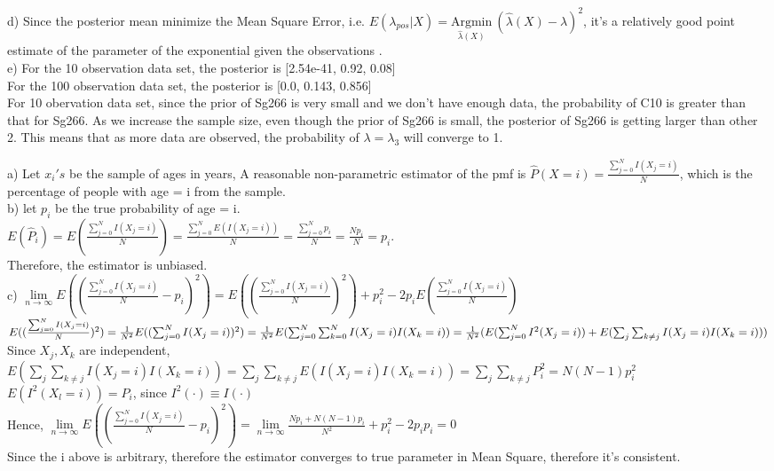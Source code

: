 \documentclass[11pt]{article}
\newenvironment{problem}[2][Problem]{\begin{trivlist}
\item[\hskip \labelsep {\bfseries #1}\hskip \labelsep {\bfseries #2.}]}{\end{trivlist}}
\begin{document}
 d) Since the posterior mean minimize the Mean Square Error, i.e. $E(\lambda_{pos}|X) =  \underset{\hat{\lambda}(X)} {\mathrm{Argmin}} ~ (\hat{\lambda}(X) - \lambda)^2 $, it's a relatively good point estimate of the parameter of the exponential given the observations .\\
 
 e) For the 10 observation data set, the posterior is [2.54e-41, 0.92, 0.08]\\
 For the 100 observation data set, the posterior is [0.0, 0.143, 0.856] \\
 For 10 obervation data set, since the prior of Sg266 is very small and we don't have enough data, the probability of C10 is greater than that for Sg266. 
 As we increase the sample size, even though the prior of Sg266 is small, the posterior of Sg266 is getting larger than other 2. This means that as more data are observed, the probability of $\lambda = \lambda_3$ will converge to 1.\\
 
\begin{problem}{3}
\end{problem} 
a) Let $x_i's$ be the sample of ages in years, A reasonable non-parametric estimator of the pmf is $\hat{P}(X = i) = \frac{\sum_{j =0}^N I(X_j =i )}{N} $, which is the percentage of people with age = i from the sample. \\

b) let $p_i$ be the true probability of age = i.\\
$E(\hat{P}_i) = E(\frac{\sum_{j =0}^N I(X_j =i )}{N}) = \frac{\sum_{j =0}^N E(I(X_j =i ))}{N} =  \frac{\sum_{j =0}^N p_i}{N} = \frac{Np_i}{N} = p_i $.\\ Therefore, the estimator is unbiased.\\

c) $\lim\limits_{n \to \infty} E((\frac{\sum_{j =0}^N I(X_j =i )}{N} - p_i)^2) = E((\frac{\sum_{j =0}^N I(X_j =i )}{N})^2) + p_i^2 - 2p_i E(\frac{\sum_{j =0}^N I(X_j =i )}{N})$ \\
$E((\frac{\sum_{j =0}^N I(X_j =i )}{N})^2) = \frac{1}{N^2} E((\sum_{j =0}^N I(X_j =i ))^2) =\frac{1}{N^2} E(\sum_{j =0}^N \sum_{k =0}^N I(X_j =i )I(X_k = i)) \\=  \frac{1}{N^2} (E(\sum_{j =0}^N I^2(X_j =i ) ) + E(\sum_j \sum_{k\ne j} I(X_j =i )I(X_k = i)))$\\
Since $X_j,X_k  $ are independent, \\
$E(\sum_j \sum_{k\ne j} I(X_j =i )I(X_k = i)) = \sum_j \sum_{k\ne j}E( I(X_j =i )I(X_k = i)) =  \sum_j \sum_{k\ne j} P^2_i = N(N-1)p^2_i$ \\
$E(I^2(X_l = i)) = P_i$, since $I^2(\cdot) \equiv I(\cdot)$\\
Hence, $\lim\limits_{n \to \infty} E((\frac{\sum_{j =0}^N I(X_j =i )}{N} - p_i)^2) = \lim\limits_{n \to \infty}\frac{Np_i + N(N-1)p_i}{N^2} + p^2_i - 2p_ip_i  = 0$\\
Since the i above is arbitrary, therefore the estimator converges to true parameter in Mean Square, therefore it's consistent. \\
\end{document}
